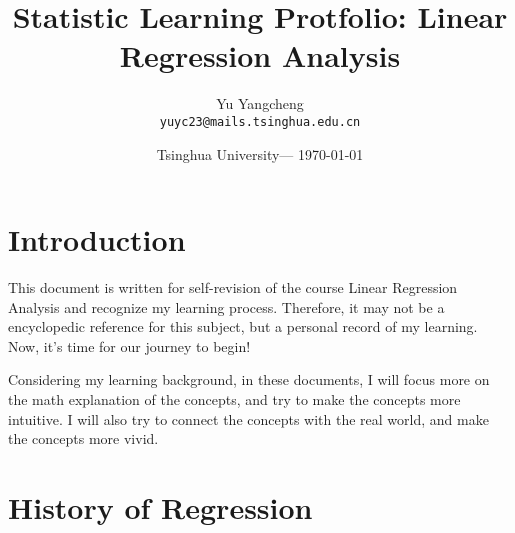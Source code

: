 \documentclass[main]{subfiles}
\title{Statistic Learning Protfolio: Linear Regression Analysis} %
\author{Yu Yangcheng\\ \texttt{yuyc23@mails.tsinghua.edu.cn}} %
\date{Tsinghua University--- \today} %
\begin{document}
\maketitle %


\section*{Introduction} %

This document is written for self-revision of the course Linear Regression Analysis and recognize my learning process. Therefore, it may not be a encyclopedic reference for this subject, but a personal record of my learning. Now, it's time for our journey to begin!

\begin{info} %
  Considering my learning background, in these documents, I will focus more on the math explanation of the concepts, and try to make the concepts more intuitive. I will also try to connect the concepts with the real world, and make the concepts more vivid.
\end{info}


\section{History of Regression} %
\end{document}
